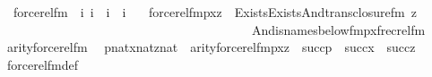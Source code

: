 \begin{isabellebody}
\isanewline
\ \ forcerel{\isacharunderscore}{\kern0pt}fm\ {\isacharcolon}{\kern0pt}{\isacharcolon}{\kern0pt}\ {\isachardoublequoteopen}i{\isasymRightarrow}\ i\ {\isasymRightarrow}\ i\ {\isasymRightarrow}\ i{\isachardoublequoteclose}\ \isanewline
\ \ {\isachardoublequoteopen}forcerel{\isacharunderscore}{\kern0pt}fm{\isacharparenleft}{\kern0pt}p{\isacharcomma}{\kern0pt}x{\isacharcomma}{\kern0pt}z{\isacharparenright}{\kern0pt}\ {\isasymequiv}\ Exists{\isacharparenleft}{\kern0pt}Exists{\isacharparenleft}{\kern0pt}And{\isacharparenleft}{\kern0pt}trans{\isacharunderscore}{\kern0pt}closure{\isacharunderscore}{\kern0pt}fm{\isacharparenleft}{\kern0pt}{}{\isacharcomma}{\kern0pt}\ z{\isacharhash}{\kern0pt}{\isacharplus}{\kern0pt}{}{\isacharparenright}{\kern0pt}{\isacharcomma}{\kern0pt}\isanewline
\ \ \ \ \ \ \ \ \ \ \ \ \ \ \ \ \ \ \ \ \ \ \ \ \ \ \ \ \ \ \ \ \ \ \ \ \ \ \ \ And{\isacharparenleft}{\kern0pt}is{\isacharunderscore}{\kern0pt}names{\isacharunderscore}{\kern0pt}below{\isacharunderscore}{\kern0pt}fm{\isacharparenleft}{\kern0pt}p{\isacharhash}{\kern0pt}{\isacharplus}{\kern0pt}{}{\isacharcomma}{\kern0pt}x{\isacharhash}{\kern0pt}{\isacharplus}{\kern0pt}{}{\isacharcomma}{\kern0pt}{}{\isacharparenright}{\kern0pt}{\isacharcomma}{\kern0pt}frecrel{\isacharunderscore}{\kern0pt}fm{\isacharparenleft}{\kern0pt}{}{\isacharcomma}{\kern0pt}{}{\isacharparenright}{\kern0pt}{\isacharparenright}{\kern0pt}{\isacharparenright}{\kern0pt}{\isacharparenright}{\kern0pt}{\isacharparenright}{\kern0pt}{\isachardoublequoteclose}\isanewline
\isanewline
{}\isamarkupfalse%
\ arity{\isacharunderscore}{\kern0pt}forcerel{\isacharunderscore}{\kern0pt}fm{\isacharcolon}{\kern0pt}\isanewline
\ \ {\isachardoublequoteopen}{\isasymlbrakk}p{\isasymin}nat{\isacharsemicolon}{\kern0pt}x{\isasymin}nat{\isacharsemicolon}{\kern0pt}z{\isasymin}nat{\isasymrbrakk}\ {\isasymLongrightarrow}\ arity{\isacharparenleft}{\kern0pt}forcerel{\isacharunderscore}{\kern0pt}fm{\isacharparenleft}{\kern0pt}p{\isacharcomma}{\kern0pt}x{\isacharcomma}{\kern0pt}z{\isacharparenright}{\kern0pt}{\isacharparenright}{\kern0pt}\ {\isacharequal}{\kern0pt}\ succ{\isacharparenleft}{\kern0pt}p{\isacharparenright}{\kern0pt}\ {\isasymunion}\ succ{\isacharparenleft}{\kern0pt}x{\isacharparenright}{\kern0pt}\ {\isasymunion}\ succ{\isacharparenleft}{\kern0pt}z{\isacharparenright}{\kern0pt}{\isachardoublequoteclose}\isanewline
%
\isadelimproof
\ \ %
\endisadelimproof
%
\isatagproof
{}\isamarkupfalse%
\ forcerel{\isacharunderscore}{\kern0pt}fm{\isacharunderscore}{\kern0pt}def\isanewline

\end{isabellebody}
